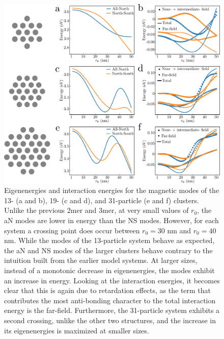 \documentclass[journal=apchd5,manuscript=article]{achemso}
\begin{document}
\begin{figure}
\includegraphics[width=6in]{13_19_31_eigen.pdf}
\caption{Eigenenergies and interaction energies for the magnetic modes of the 13- (a and b), 19- (c and d), and 31-particle (e and f) clusters. Unlike the previous 2mer and 3mer, at very small values of $r_0$, the aN modes are lower in energy than the NS modes. However, for each system a crossing point does occur between $r_0 = 30$ nm and $r_0 = 40$ nm. While the modes of the 13-particle system behave as expected, the aN and NS modes of the larger clusters behave contrary to the intuition built from the earlier model systems. At larger sizes, instead of a monotonic decrease in eigenenergies, the modes exhibit an increase in energy. Looking at the interaction energies, it becomes clear that this is again due to retardation effects, as the term that contributes the most anti-bonding character to the total interaction energy is the far-field. Furthermore, the 31-particle system exhibits a second crossing, unlike the other two structures, and the increase in its eigenenergies is maximized at smaller sizes.}
\label{kagan_eigen}
\end{figure}
\end{document}
